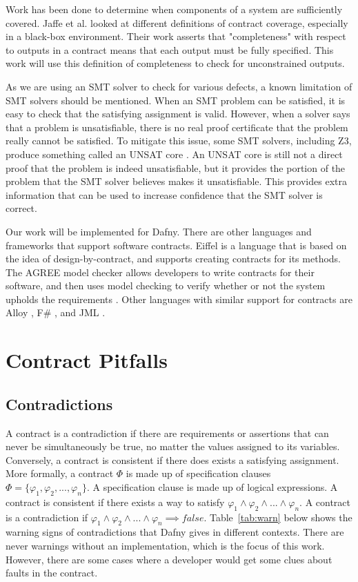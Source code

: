 \documentclass{article}
\newcommand{\tabref}[1]{Table~\ref{#1}}
\begin{document}
Work has been done to determine when components of a system are sufficiently covered. Jaffe et al. \cite{jaffe1989completeness}
looked at different definitions of contract coverage, especially in a black-box environment. Their work asserts that "completeness"
with respect to outputs in a contract means that each output must be fully specified. This work will use this definition of
completeness to check for unconstrained outputs.

As we are using an SMT solver to check for various defects, a known limitation of SMT solvers should be mentioned. When an SMT problem can be satisfied, it is easy 
to check that the satisfying assignment is valid. However, when a solver says that a problem is unsatisfiable, there is no real proof certificate that the problem 
really cannot be satisfied. To mitigate this issue, some SMT solvers, including Z3, produce something called an UNSAT core \cite{guthmann2016minimal}. An UNSAT core is still not a 
direct proof that the problem is indeed unsatisfiable, but it provides the portion of the problem that the SMT solver believes makes it unsatisfiable. This provides extra information 
that can be used to increase confidence that the SMT solver is correct. 

Our work will be implemented for Dafny. There are other languages and frameworks that support software contracts. Eiffel \cite{meyer1988eiffel} is a language that 
is based on the idea of design-by-contract, and supports creating contracts for its methods. The AGREE model checker allows developers to write contracts for their 
software, and then uses model checking to verify whether or not the system upholds the requirements \cite{mercer2023synthesizing}. Other languages with similar 
support for contracts are Alloy \cite{jackson2002alloy}, F\# \cite{syme2010f}, and JML \cite{leavens1998jml}. 

\section{Contract Pitfalls}

\subsection{Contradictions}

A contract is a contradiction if there are requirements or assertions that can never be simultaneously be true, no matter the values assigned 
to its variables. Conversely, a contract is consistent if there does exists a satisfying assignment. More formally, a
contract \(\Phi\) is made up of specification clauses \(\Phi = \{\varphi_{1}, \varphi_{2}, ..., \varphi_{n}\}\).
A specification clause is made up of logical expressions. A contract is consistent if there exists a way to satisfy
\(\varphi_{1} \land \varphi_{2} \land ... \land \varphi_{n} \). A contract is a contradiction
if \(\varphi_{1} \land \varphi_{2} \land ... \land \varphi_{n} \implies false\). \tabref{tab:warn} below shows the warning signs of contradictions that Dafny gives in different 
contexts. There are never warnings without an implementation, which is the focus of this work. However, there are some cases where a developer would get some clues about 
faults in the contract. 
\end{document}
